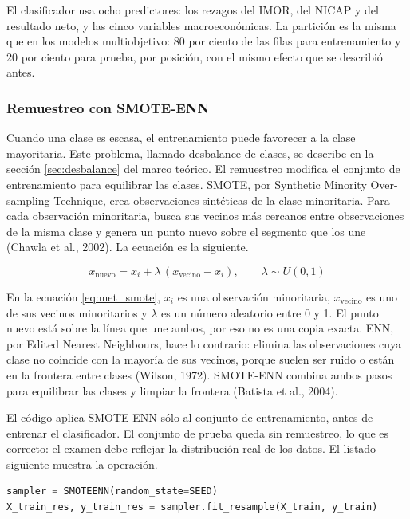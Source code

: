 El clasificador usa ocho predictores: los rezagos del IMOR, del NICAP y del resultado neto, y las cinco variables macroeconómicas. La partición es la misma que en los modelos multiobjetivo: 80 por ciento de las filas para entrenamiento y 20 por ciento para prueba, por posición, con el mismo efecto que se describió antes.

\subsubsection{Remuestreo con SMOTE-ENN}
Cuando una clase es escasa, el entrenamiento puede favorecer a la clase mayoritaria. Este problema, llamado desbalance de clases, se describe en la sección \ref{sec:desbalance} del marco teórico. El remuestreo modifica el conjunto de entrenamiento para equilibrar las clases. SMOTE, por Synthetic Minority Over-sampling Technique, crea observaciones sintéticas de la clase minoritaria. Para cada observación minoritaria, busca sus vecinos más cercanos entre observaciones de la misma clase y genera un punto nuevo sobre el segmento que los une (Chawla et al., 2002). La ecuación es la siguiente.

\begin{equation}
\label{eq:met_smote}
x_{\text{nuevo}} = x_i + \lambda\,(x_{\text{vecino}} - x_i), \qquad \lambda \sim U(0,1)
\end{equation}

En la ecuación \eqref{eq:met_smote}, $x_i$ es una observación minoritaria, $x_{\text{vecino}}$ es uno de sus vecinos minoritarios y $\lambda$ es un número aleatorio entre 0 y 1. El punto nuevo está sobre la línea que une ambos, por eso no es una copia exacta. ENN, por Edited Nearest Neighbours, hace lo contrario: elimina las observaciones cuya clase no coincide con la mayoría de sus vecinos, porque suelen ser ruido o están en la frontera entre clases (Wilson, 1972). SMOTE-ENN combina ambos pasos para equilibrar las clases y limpiar la frontera (Batista et al., 2004).

El código aplica SMOTE-ENN sólo al conjunto de entrenamiento, antes de entrenar el clasificador. El conjunto de prueba queda sin remuestreo, lo que es correcto: el examen debe reflejar la distribución real de los datos. El listado siguiente muestra la operación.

\begin{lstlisting}[language=Python, caption={Remuestreo SMOTE-ENN sobre el conjunto de entrenamiento}, label={lst:met_smoteenn}]
sampler = SMOTEENN(random_state=SEED)
X_train_res, y_train_res = sampler.fit_resample(X_train, y_train)
\end{lstlisting}

